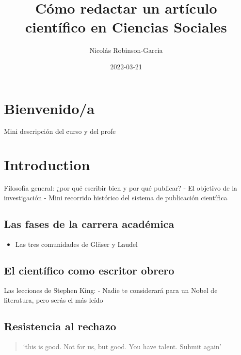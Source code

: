 \documentclass[
]{book}
\title{Cómo redactar un artículo científico en Ciencias Sociales}
\author{Nicolás Robinson-Garcia}
\date{2022-03-21}
\providecommand{\tightlist}{%
  \setlength{\itemsep}{0pt}\setlength{\parskip}{0pt}}
\begin{document}
\maketitle

{
\setcounter{tocdepth}{1}
\tableofcontents
}
\hypertarget{bienvenidoa}{%
\chapter*{Bienvenido/a}\label{bienvenidoa}}

Mini descripción del curso y del profe

\hypertarget{intro}{%
\chapter{Introduction}\label{intro}}

Filosofía general: ¿por qué escribir bien y por qué publicar?
- El objetivo de la investigación
- Mini recorrido histórico del sistema de publicación científica

\hypertarget{las-fases-de-la-carrera-acaduxe9mica}{%
\section{Las fases de la carrera académica}\label{las-fases-de-la-carrera-acaduxe9mica}}

\begin{itemize}
\tightlist
\item
  Las tres comunidades de Gläser y Laudel
\end{itemize}

\hypertarget{el-cientuxedfico-como-escritor-obrero}{%
\section{El científico como escritor obrero}\label{el-cientuxedfico-como-escritor-obrero}}

Las lecciones de Stephen King:
- Nadie te considerará para un Nobel de literatura, pero serás el más leído

\hypertarget{resistencia-al-rechazo}{%
\section{Resistencia al rechazo}\label{resistencia-al-rechazo}}

\begin{quote}
`this is good. Not for us, but good. You have talent. Submit again'
\end{quote}
\end{document}
